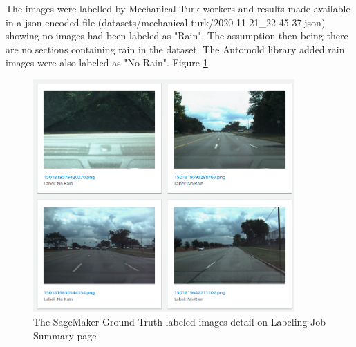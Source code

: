 The images were labelled by Mechanical Turk workers and results made available in a json encoded file (datasets/mechanical-turk/2020-11-21\_22 45 37.json) showing no images had been labeled as "Rain". The assumption then being there are no sections containing rain in the dataset. The Automold library added rain images were also labeled as "No Rain". Figure \ref{fig:MechTurkLabeledImages}
\begin{figure}[h!]
\centering
\includegraphics[width=10cm]{Figures/MechTurkLabeledImages.png}
\caption{The SageMaker Ground Truth labeled images detail on Labeling Job Summary page}
\label{fig:MechTurkLabeledImages}
\end{figure}